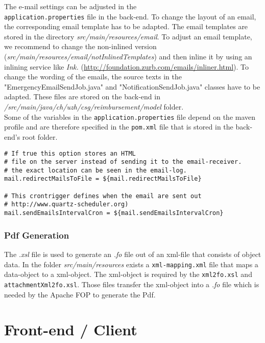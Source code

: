The e-mail settings can be adjusted in the \\ \texttt{application.properties} file in the back-end. To change the layout of an email, the corresponding email template has to be adapted. The email templates are stored in the directory \textit{src/main/resources/email}. To adjust an email template, we recommend to change the non-inlined version (\textit{src/main/resources/email/notInlinedTemplates}) and then inline it by using an inlining service like \textit{Ink.} (\url{http://foundation.zurb.com/emails/inliner.html}). To change the wording of the emails, the source texts in the "EmergencyEmailSendJob.java" and "NotificationSendJob.java" classes have to be adapted. These files are stored on the back-end in \textit{/src/main/java/ch/uzh/csg/reimbursement/model} folder. \newline \\
Some of the variables in the \texttt{application.properties} file depend on the maven profile and are therefore specified in the \texttt{pom.xml} file that is stored in the back-end's root folder.

\begin{lstlisting}
# If true this option stores an HTML
# file on the server instead of sending it to the email-receiver.
# the exact location can be seen in the email-log.
mail.redirectMailsToFile = ${mail.redirectMailsToFile}

# This crontrigger defines when the email are sent out
# http://www.quartz-scheduler.org)
mail.sendEmailsIntervalCron = ${mail.sendEmailsIntervalCron}
\end{lstlisting}

\subsubsection{Pdf Generation}
\label{subsubsec:pdf-xml-mappings}

The \textit{.xsl} file is used to generate an \textit{.fo} file out of an xml-file that consists of object data. In the folder \textit{src/main/resources} exists a \texttt{xml-mapping.xml} file that maps a data-object to a xml-object. The xml-object is required by the \texttt{xml2fo.xsl} and \texttt{attachmentXml2fo.xsl}. Those files transfer the xml-object into a \textit{.fo} file which is needed by the Apache FOP to generate the Pdf.



\section{Front-end / Client}


